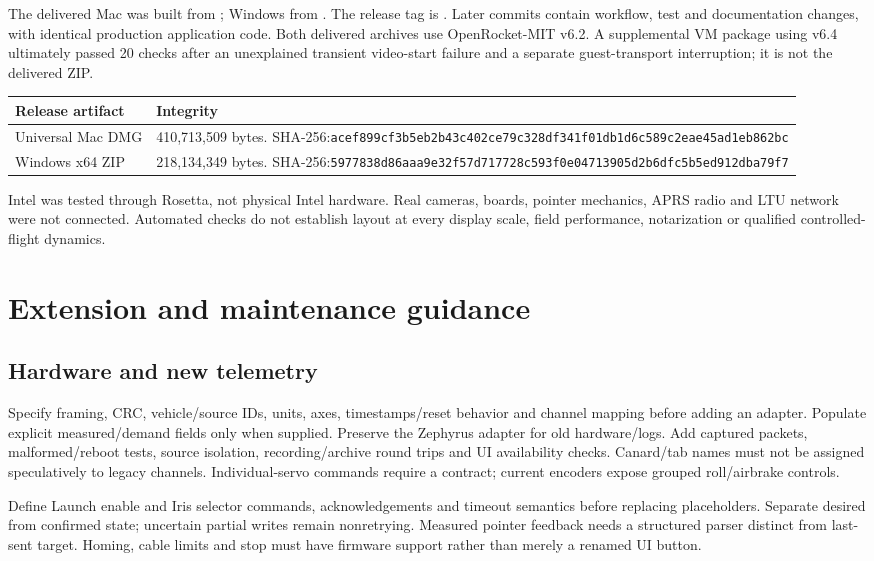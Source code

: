 The delivered Mac was built from ; Windows from .
The release tag is . Later commits contain workflow, test and
documentation changes, with identical production application code. Both
delivered archives use OpenRocket-MIT v6.2. A supplemental VM package using
v6.4 ultimately passed 20 checks after an unexplained transient video-start
failure and a separate guest-transport interruption; it is not the delivered ZIP.

\begin{longtable}{@{}L{.24\linewidth}L{.69\linewidth}@{}}
\toprule Release artifact & Integrity \\\midrule\endhead
Universal Mac DMG & 410,713,509 bytes. SHA-256:\newline\nolinkurl{acef899cf3b5eb2b43c402ce79c328df341f01db1d6c589c2eae45ad1eb862bc} \\
Windows x64 ZIP & 218,134,349 bytes. SHA-256:\newline\nolinkurl{5977838d86aaa9e32f57d717728c593f0e04713905d2b6dfc5b5ed912dba79f7} \\
\bottomrule
\end{longtable}
Intel was tested through Rosetta, not physical Intel hardware. Real cameras,
boards, pointer mechanics, APRS radio and LTU network were not connected.
Automated checks do not establish layout at every display scale, field
performance, notarization or qualified controlled-flight dynamics.

\section{Extension and maintenance guidance}\label{sec:extend}
\subsection{Hardware and new telemetry}
Specify framing, CRC, vehicle/source IDs, units, axes, timestamps/reset behavior
and channel mapping before adding an adapter. Populate explicit measured/demand
fields only when supplied. Preserve the Zephyrus adapter for old hardware/logs.
Add captured packets, malformed/reboot tests, source isolation, recording/archive
round trips and UI availability checks. Canard/tab names must not be assigned
speculatively to legacy channels. Individual-servo commands require a contract;
current encoders expose grouped roll/airbrake controls.

Define Launch enable and Iris selector commands, acknowledgements and timeout
semantics before replacing placeholders. Separate desired from confirmed state;
uncertain partial writes remain nonretrying. Measured pointer feedback needs a
structured parser distinct from last-sent target. Homing, cable limits and stop
must have firmware support rather than merely a renamed UI button.

